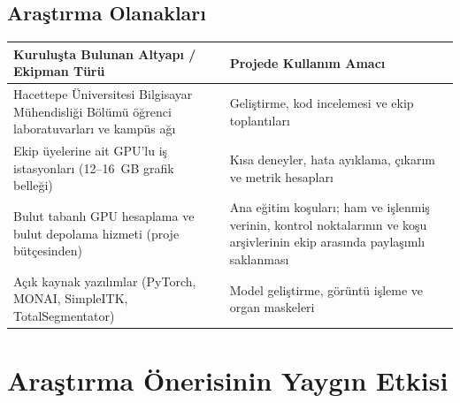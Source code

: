\documentclass[11pt,a4paper]{article}
\begin{document}
\subsection{Araştırma Olanakları}

{\small
\begin{tabularx}{\textwidth}{@{}YY@{}}
\toprule
Kuruluşta Bulunan Altyapı / Ekipman Türü & Projede Kullanım Amacı \\
\midrule
Hacettepe Üniversitesi Bilgisayar Mühendisliği Bölümü öğrenci laboratuvarları ve kampüs ağı
  & Geliştirme, kod incelemesi ve ekip toplantıları \\
Ekip üyelerine ait GPU'lu iş istasyonları (12--16~GB grafik belleği)
  & Kısa deneyler, hata ayıklama, çıkarım ve metrik hesapları \\
Bulut tabanlı GPU hesaplama ve bulut depolama hizmeti (proje bütçesinden)
  & Ana eğitim koşuları; ham ve işlenmiş verinin, kontrol noktalarının ve koşu arşivlerinin ekip
  arasında paylaşımlı saklanması \\
Açık kaynak yazılımlar (PyTorch, MONAI, SimpleITK, TotalSegmentator)
  & Model geliştirme, görüntü işleme ve organ maskeleri \\
\bottomrule
\end{tabularx}
}

\section{Araştırma Önerisinin Yaygın Etkisi}
\end{document}
